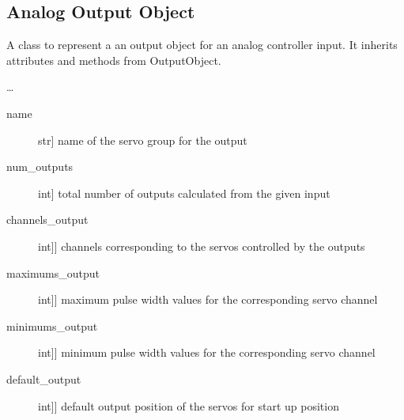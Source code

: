 \documentclass[letterpaper,10pt,english]{sphinxmanual}
\begin{document}
\subsection{Analog Output Object}
\label{\detokenize{generic:module-AnalogOutputObject}}\label{\detokenize{generic:analog-output-object}}

\begin{fulllineitems}
\label{\detokenize{generic:AnalogOutputObject.AnalogOutputObject}}
\sphinxAtStartPar
A class to represent a an output object for an analog controller input.
It inherits attributes and methods from OutputObject.

\sphinxAtStartPar
…

\sphinxAtStartPar
{}
\begin{description}
\item[{name}] \leavevmode{[}str{]}
\sphinxAtStartPar
name of the servo group for the output

\item[{num\_outputs}] \leavevmode{[}int{]}
\sphinxAtStartPar
total number of outputs calculated from the given input

\item[{channels\_output}] \leavevmode{[}{[}int{]}{]}
\sphinxAtStartPar
channels corresponding to the servos controlled by the outputs

\item[{maximums\_output}] \leavevmode{[}{[}int{]}{]}
\sphinxAtStartPar
maximum pulse width values for the corresponding servo channel

\item[{minimums\_output}] \leavevmode{[}{[}int{]}{]}
\sphinxAtStartPar
minimum pulse width values for the corresponding servo channel

\item[{default\_output}] \leavevmode{[}{[}int{]}{]}
\sphinxAtStartPar
default output position of the servos for start up position


\end{description}
\end{fulllineitems}
\end{document}
